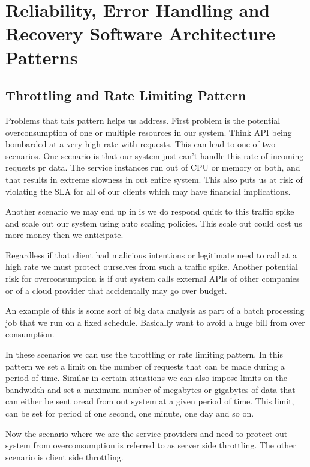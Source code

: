 \section{Reliability, Error Handling and Recovery Software Architecture Patterns}

\subsection{Throttling and Rate Limiting Pattern}
Problems that this pattern helps us address.
First problem is the potential overconsumption of one or multiple resources in our system.
Think API being bombarded at a very high rate with requests.
This can lead to one of two scenarios.
One scenario is that our system just can't handle this rate of incoming requests pr data.
The service instances run out of CPU or memory or both, and that results in extreme slowness in out entire system.
This also puts us at risk of violating the SLA for all of our clients which may have financial implications.

Another scenario we may end up in is we do respond quick to this traffic spike and scale out our system using auto scaling policies.
This scale out could cost us more money then we anticipate.

Regardless if that client had malicious intentions or legitimate need to call at a high rate we must protect ourselves from such a traffic spike.
Another potential risk for overconsumption is if out system calls external APIs of other companies or of a cloud provider that accidentally may go over budget.

An example of this is some sort of big data analysis as part of a batch processing job that we run on a fixed schedule.
Basically want to avoid a huge bill from over consumption.

In these scenarios we can use the throttling or rate limiting pattern.
In this pattern we set a limit on the number of requests that can be made during a period of time.
Similar in certain situations we can also impose limits on the bandwidth and set a maximum number of megabytes or gigabytes of data that can either be sent oread from out system at a given period of time.
This limit, can be set for period of one second, one minute, one day and so on.

Now the scenario where we are the service providers and need to protect out system from overconsumption is referred to as server side throttling.
The other scenario is client side throttling.

